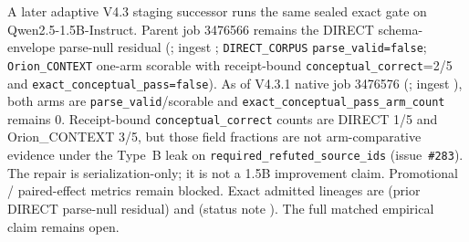 \begin{sloppypar}
A later adaptive V4.3 staging successor runs the same sealed exact gate on
Qwen2.5-1.5B-Instruct.  Parent job 3476566 remains the DIRECT schema-envelope
parse-null residual
(; ingest
;
\texttt{DIRECT\_CORPUS} \texttt{parse\_valid=false}; \texttt{Orion\_CONTEXT}
one-arm scorable with receipt-bound \texttt{conceptual\_correct}=2/5 and
\texttt{exact\_conceptual\_pass=false}).  As of
V4.3.1 native job 3476576
(; ingest
),
both arms are \texttt{parse\_valid}/scorable and
\texttt{exact\_conceptual\_pass\_arm\_count} remains 0.  Receipt-bound
\texttt{conceptual\_correct} counts are DIRECT 1/5 and Orion\_CONTEXT 3/5, but
those field fractions are not arm-comparative evidence under the Type~B leak
on \texttt{required\_refuted\_source\_ids} (issue~\texttt{\#283}).  The repair is
serialization-only; it is not a 1.5B improvement claim.  Promotional /
paired-effect metrics remain blocked.  Exact admitted lineages are
(prior DIRECT parse-null residual) and
(status note
).
The full matched empirical claim remains open.
\end{sloppypar}
